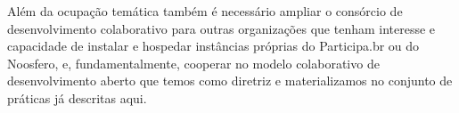 \documentclass{article}
\begin{document}
Além da ocupação temática também é necessário ampliar o consórcio de
desenvolvimento colaborativo para outras organizações que tenham interesse e
capacidade de instalar e hospedar instâncias próprias do Participa.br ou do
Noosfero, e, fundamentalmente, cooperar no modelo colaborativo de
desenvolvimento aberto que temos como diretriz e materializamos no conjunto de
práticas já descritas aqui.

%
%
%
%
%
%
%
%
\end{document}
